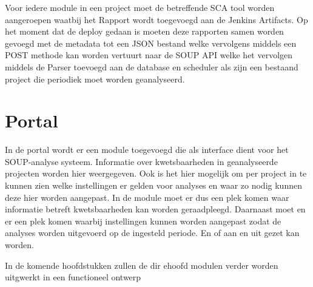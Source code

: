 Voor iedere module in een project moet de betreffende SCA tool worden aangeroepen waatbij het Rapport wordt toegevoegd aan de Jenkins Artifacts.
Op het moment dat de deploy gedaan is moeten deze rapporten samen worden gevoegd met de metadata tot een JSON bestand welke vervolgens middels een POST methode kan worden vertuurt naar de SOUP API welke het vervolgen middels de Parser toevoegd aan de database en scheduler als zijn een bestaand project die periodiek moet worden geanalyseerd.

\section{Portal}\label{sec:portal}
In de portal wordt er een module toegevoegd die als interface dient voor het SOUP-analyse systeem. Informatie over kwetsbaarheden in geanalyseerde projecten worden hier weergegeven. Ook is het hier mogelijk om per project in te kunnen zien welke instellingen er gelden voor analyses en waar zo nodig kunnen deze hier worden aangepast.
In de module moet er dus een plek komen waar informatie betreft kwetsbaarheden kan worden geraadpleegd. Daarnaast moet en er een plek komen waarbij instellingen kunnen worden aangepast zodat de analyses worden uitgevoerd op de ingesteld periode. En of aan en uit gezet kan worden.

In de komende hoofdstukken zullen de dir ehoofd modulen verder worden uitgwerkt in een functioneel ontwerp
